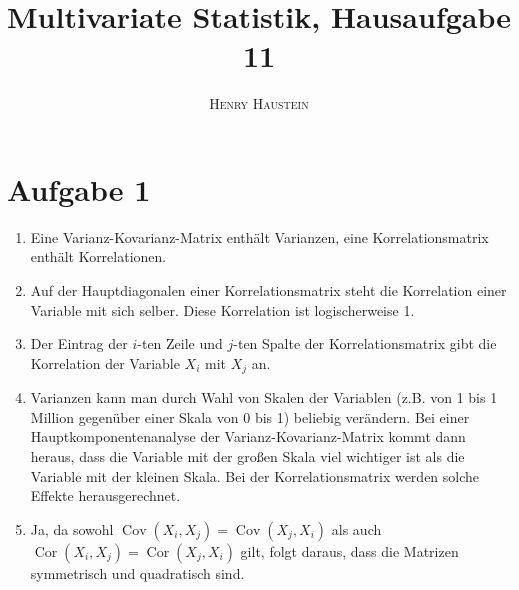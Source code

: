 \documentclass{article}
\title{\textbf{Multivariate Statistik, Hausaufgabe 11}}
\author{\textsc{Henry Haustein}}
\date{}
\DeclareMathOperator{\Cov}{Cov}
\DeclareMathOperator{\Cor}{Cor}
\begin{document}
	\maketitle
	
	\section*{Aufgabe 1}
	\begin{enumerate}[label=(\alph*)]
		\item Eine Varianz-Kovarianz-Matrix enthält Varianzen, eine Korrelationsmatrix enthält Korrelationen.
		\item Auf der Hauptdiagonalen einer Korrelationsmatrix steht die Korrelation einer Variable mit sich selber. Diese Korrelation ist logischerweise 1.
		\item Der Eintrag der $i$-ten Zeile und $j$-ten Spalte der Korrelationsmatrix gibt die Korrelation der Variable $X_i$ mit $X_j$ an.
		\item Varianzen kann man durch Wahl von Skalen der Variablen (z.B. von 1 bis 1 Million gegenüber einer Skala von 0 bis 1) beliebig verändern. Bei einer Hauptkomponentenanalyse der Varianz-Kovarianz-Matrix kommt dann heraus, dass die Variable mit der großen Skala viel wichtiger ist als die Variable mit der kleinen Skala. Bei der Korrelationsmatrix werden solche Effekte herausgerechnet.
		\item Ja, da sowohl $\Cov(X_i,X_j)=\Cov(X_j,X_i)$ als auch $\Cor(X_i,X_j)=\Cor(X_j,X_i)$ gilt, folgt daraus, dass die Matrizen symmetrisch und quadratisch sind.
	\end{enumerate}
\end{document}
